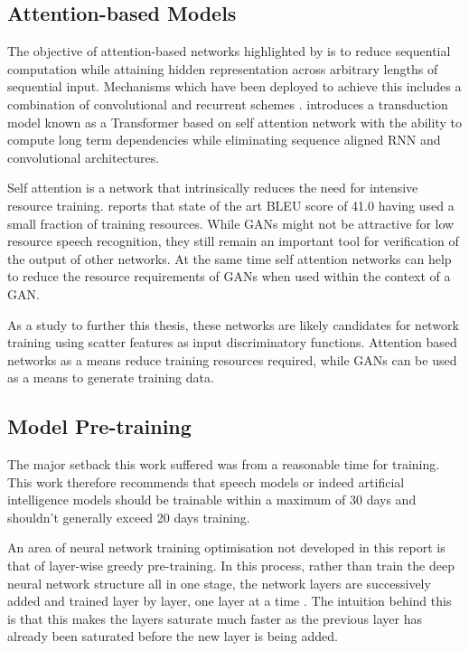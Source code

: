 \subsection{Attention-based Models}

The objective of attention-based networks highlighted by  \cite{vaswani2017attention} is to reduce sequential computation while attaining hidden representation across arbitrary lengths of sequential input. Mechanisms which have been deployed to achieve this includes a combination of convolutional and recurrent schemes \citep{kaiser2016can,kalchbrenner2016neural, gehring2017convolutional}. \cite{vaswani2017attention} introduces a transduction model known as a Transformer based on self attention network with the ability to compute long term dependencies while eliminating sequence aligned RNN and convolutional architectures.

Self attention is a network that intrinsically reduces the need for intensive resource training.  \cite{vaswani2017attention} reports that state of the art BLEU score of 41.0 having used a small fraction of training resources.  While GANs might not be attractive for low resource speech recognition, they still remain an important tool for verification of the output of other networks.  At the same time self attention networks can help to reduce the resource requirements of GANs when used within the context of a GAN.

As a study to further this thesis, these networks are likely candidates for network training using scatter features as input discriminatory functions.  Attention based networks as a means reduce training resources required, while GANs can be used as a means to generate training data.

\subsection{Model Pre-training}
The major setback this work suffered was from a reasonable time for training.  This work therefore recommends that speech models or indeed artificial intelligence models should be trainable within a maximum of 30 days and shouldn't generally exceed 20 days training.

An area of neural network training optimisation not developed in this report is that of layer-wise greedy pre-training.  In this process, rather than train the deep neural network structure all in one stage, the network layers are successively added and trained layer by layer, one layer at a time \citep{Goodfellow-et-al-2016}.  The intuition behind this is that this makes the layers saturate much faster as the previous layer has already been saturated before the new layer is being added.

